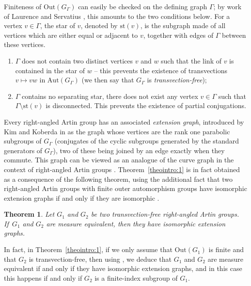 \documentclass[JEP,XML,SOM,Unicode,NoFloatCountersInSection,published]{cedram}
\theoremstyle{plain}
\newtheorem{theointro}{Theorem}
\theoremstyle{definition}
\newcommand{\Aut}{\mathrm{Aut}}
\newcommand{\Out}{\mathrm{Out}}
\newcommand{\st}{\mathrm{st}}
\begin{document}
Finiteness of $\Out(G_\Gamma)$ can easily be checked on the defining graph $\Gamma$; by work of Laurence \cite{laurence1995generating} and Servatius \cite{Ser}, this amounts to the two conditions below. For a vertex $v\in\Gamma$, the star of $v$, denoted by $\st(v)$, is the subgraph made of all vertices which are either equal or adjacent to $v$, together with edges of $\Gamma$ between these vertices.
\begin{enumerate}
\item $\Gamma$ does not contain two distinct vertices $v$ and $w$ such that the link of $v$ is contained in the star of $w$ -- this prevents the existence of transvections $v\mapsto vw$ in $\Aut(G_\Gamma)$ (we then say that $G_\Gamma$ is \emph{transvection-free});
\item $\Gamma$ contains no separating star, \ie there does not exist any vertex $v\in\Gamma$ such that $\Gamma\setminus \st(v)$ is disconnected. This prevents the existence of partial conjugations.
\end{enumerate}

Every right-angled Artin group has an associated \emph{extension graph}, introduced by Kim and Koberda in \cite{kim2013embedability} as the graph whose vertices are the rank one parabolic subgroups of $G_\Gamma$ (\ie conjugates of the cyclic subgroups generated by the standard generators of $G_\Gamma$), two of these being joined by an edge exactly when they commute. This graph can be viewed as an analogue of the curve graph in the context of right-angled Artin groups \cite{kim2014geometry}. Theorem~\ref{theointro:1} is in fact obtained as a consequence of the following theorem, using the additional fact that two right-angled Artin groups with finite outer automorphism groups have isomorphic extension graphs if and only if they are isomorphic \cite{Hua}.

\begin{theointro}\label{theointro:main}
Let $G_1$ and $G_2$ be two transvection-free right-angled Artin groups. If~$G_1$ and $G_2$ are measure equivalent, then they have isomorphic extension graphs.
\end{theointro}

In fact, in Theorem~\ref{theointro:1}, if we only assume that $\Out(G_1)$ is finite and that $G_2$ is transvection-free, then using \cite[Th.\,1.2]{Hua}, we deduce that $G_1$ and $G_2$ are measure equivalent if and only if they have isomorphic extension graphs, and in this case this happens if and only if $G_2$ is a finite-index subgroup of $G_1$.
\end{document}
